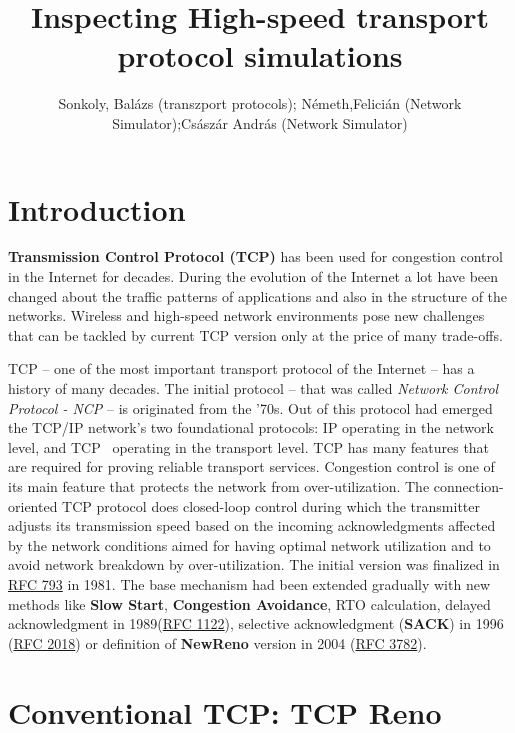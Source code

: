 \documentclass[a4paper]{article}
\title{Inspecting High-speed transport protocol simulations}
\author{Sonkoly, Balázs (transzport protocols); Németh,Felicián (Network Simulator);Császár András (Network Simulator)
}
\date{}
\begin{document}
\maketitle

\tableofcontents

\section{Introduction}

\textbf{Transmission Control Protocol (TCP)} has been used for congestion control in the Internet for decades. During
the evolution of the Internet a lot have been changed about the traffic patterns of applications and also in the
structure of the networks. Wireless and high-speed network environments pose new challenges that can be tackled by
current TCP version only at the price of many trade-offs.

TCP -- one of the most important transport protocol of the Internet -- has a history of many decades. The initial
protocol -- that was called \emph{Network Control Protocol - NCP} -- is originated from the '70s. Out of this protocol
had emerged the TCP/IP network's two foundational protocols: IP operating in the network level, and
TCP~\cite{CongestionAvoidance} operating in the transport level. TCP has many features that are required for proving
reliable transport services. Congestion control is one of its main feature that protects the network from
over-utilization. The connection-oriented TCP protocol does closed-loop control during which the transmitter adjusts
its transmission speed based on the incoming acknowledgments affected by the network conditions aimed for having
optimal network utilization and to avoid network breakdown by over-utilization. The initial version was finalized in
\href{http://www.faqs.org/rfcs/rfc793.html}{RFC 793} in 1981. The base mechanism had been extended gradually with new
methods like \textbf{Slow Start}, \textbf{Congestion Avoidance}, RTO calculation, delayed acknowledgment in
1989(\href{http://www.faqs.org/rfcs/rfc1122.html}{RFC 1122}), selective acknowledgment (\textbf{SACK}) in 1996
(\href{http://www.faqs.org/rfcs/rfc2018.html}{RFC 2018}) or definition of \textbf{NewReno} version in 2004
(\href{http://www.faqs.org/rfcs/rfc3782.html}{RFC 3782}).

\section{Conventional TCP: TCP Reno}
\end{document}
